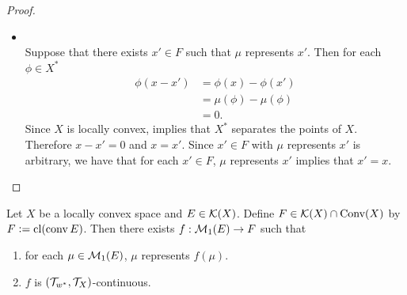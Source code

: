 \documentclass{book}
\begin{document}
\begin{proof}
\begin{enumerate}
\begin{itemize}
\begin{align*}
					& \iff  \text{there exists $x \in F$ such that $\mu$ represents $x$},
				\end{align*}
				we have that there exists $x \in F$ such that $\mu$ represents $x$.
				\item {} \\
				Suppose that there exists $x' \in F$ such that $\mu$ represents $x'$. Then for each $\phi \in X^*$
				\begin{align*}
					\phi(x - x')
					& = \phi(x) - \phi(x') \\
					& = \mu(\phi) - \mu(\phi) \\
					& = 0.
				\end{align*}
				Since $X$ is locally convex,  implies that $X^*$ separates the points of $X$. Therefore $x-x' = 0$ and $x = x'$. Since $x' \in F$ with $\mu$ represents $x'$ is arbitrary, we have that for each $x' \in F$, $\mu$ represents $x'$ implies that $x' = x$. 
			\end{itemize}
		\end{enumerate}
	\end{proof}
	
	
	\begin{ex}
		Let $X$ be a locally convex space and $E \in \mathcal{K}(X)$. Define $F \in \mathcal{K}(X) \cap \text{Conv}(X)$ by $F \vcentcolon= \operatorname{cl} (\operatorname{conv} E)$. Then there exists $f: \mathcal{M}_1(E) \rightarrow F$ such that 
		\begin{enumerate}
			\item for each $\mu \in \mathcal{M}_1(E)$, $\mu$ represents $f(\mu)$. 
			\item $f$ is $(\mathcal{T}_{w^*}, \mathcal{T}_X)$-continuous.
		\end{enumerate}
	\end{ex}
	
\end{document}
